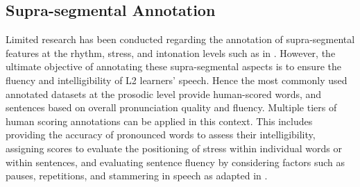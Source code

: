 

\subsection{Supra-segmental Annotation}
\label{sec:supra_anno}
Limited research has been conducted regarding the annotation of supra-segmental features at the rhythm, stress, and intonation levels such as in \cite{arvaniti2000greek, chen2016singakids, cole2017crowd}. However, the ultimate objective of annotating these supra-segmental aspects is to ensure the fluency and intelligibility of L2 learners' speech. Hence the most commonly used annotated datasets at the prosodic level provide human-scored words, and sentences based on overall pronunciation quality and fluency. Multiple tiers of human scoring annotations can be applied in this context. This includes providing the accuracy of pronounced words to assess their intelligibility, assigning scores to evaluate the positioning of stress within individual words or within sentences, and evaluating sentence fluency by considering factors such as pauses, repetitions, and stammering in speech as adapted in \cite{zhang2021speechocean762}.



